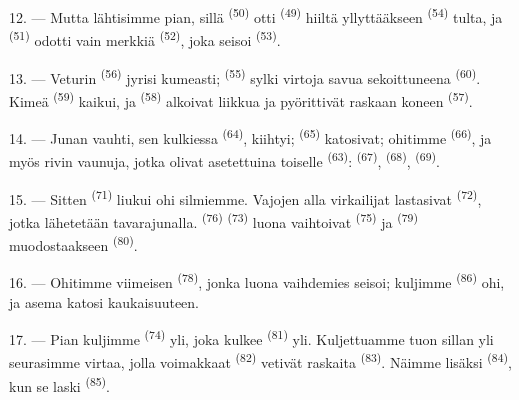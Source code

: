 12. --- Mutta lähtisimme pian, sillä  \textsuperscript{(50)}
otti  \textsuperscript{(49)} hiiltä yllyttääkseen
 \textsuperscript{(54)} tulta, ja 
\textsuperscript{(51)} odotti vain merkkiä 
\textsuperscript{(52)}, joka seisoi  \textsuperscript{(53)}.

13. --- Veturin  \textsuperscript{(56)} jyrisi kumeasti;
 \textsuperscript{(55)} sylki virtoja savua sekoittuneena
 \textsuperscript{(60)}. Kimeä 
\textsuperscript{(59)} kaikui, ja  \textsuperscript{(58)}
alkoivat liikkua ja pyörittivät raskaan koneen 
\textsuperscript{(57)}.

\VUsaut{3.0mm}
\VUsaut{3.0mm}

14. --- Junan vauhti, sen kulkiessa  \textsuperscript{(64)},
kiihtyi;  \textsuperscript{(65)} katosivat; ohitimme
 \textsuperscript{(66)}, ja myös rivin vaunuja, jotka olivat
asetettuina toiselle  \textsuperscript{(63)}:
 \textsuperscript{(67)}, 
\textsuperscript{(68)},  \textsuperscript{(69)}.


15. --- Sitten  \textsuperscript{(71)} liukui ohi silmiemme.
Vajojen alla virkailijat lastasivat  \textsuperscript{(72)},
jotka lähetetään tavarajunalla.  \textsuperscript{(76)}
 \textsuperscript{(73)} luona vaihtoivat
 \textsuperscript{(75)} ja 
\textsuperscript{(79)} muodostaakseen 
\textsuperscript{(80)}.

16. --- Ohitimme viimeisen  \textsuperscript{(78)}, jonka luona
vaihdemies seisoi; kuljimme  \textsuperscript{(86)} ohi, ja
asema katosi kaukaisuuteen.

17. --- Pian kuljimme  \textsuperscript{(74)} yli, joka
kulkee  \textsuperscript{(81)} yli. Kuljettuamme tuon sillan yli
seurasimme virtaa, jolla voimakkaat  \textsuperscript{(82)}
vetivät raskaita  \textsuperscript{(83)}. Näimme lisäksi
 \textsuperscript{(84)}, kun se laski
 \textsuperscript{(85)}.

